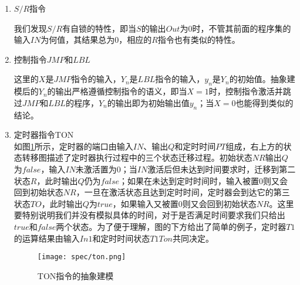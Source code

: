 \begin{enumerate}
	\item $S/R$指令\\
	\begin{center}
	\end{center}
	我们发现$S/R$有自锁的特性，即当$S$的输出$Out$为0时，不管其前面的程序集的输入$IN$为何值，其结果总为0，相应的$R$指令也有类似的特性。

	\item 控制指令$JMP$和$LBL$\\
	\begin{center}
	\end{center}
	这里的$X$是$JMP$指令的输入，$Y_n$是$LBL$指令的输入，$y_n$是$Y_n$的初始值。抽象建模后的$Y_n$的输出严格遵循控制指令的语义，即当$X=1$时，控制指令激活并跳过$JMP$和$LBL$的程序，$Y_n$的输出即为初始输出值$y_n$；当$X=0$也能得到类似的结论。
	\item 定时器指令TON\\
	如图\ref{fig22}所示，定时器的端口由输入$IN$、输出$Q$和定时时间$PT$组成，右上方的状态转移图描述了定时器执行过程中的三个状态迁移过程。初始状态$NR$输出$Q$为$false$，输入$IN$未激活置为0；当$IN$激活后但未达到时间要求时，迁移到第二状态$R$，此时输出$Q$仍为$false$；如果在未达到定时时间时，输入被置0则又会回到初始状态$NR$，一旦在激活状态且达到定时时间，定时器会到达它的第三状态$TO$，此时输出$Q$为$true$，如果输入又被置0则又会回到初始状态$NR$。这里要特别说明我们并没有模拟具体的时间，对于是否满足时间要求我们只给出$true$和$false$两个状态。为了便于理解，图的下方给出了简单的例子，定时器$T1$的运算结果由输入$In1$和定时时间状态$T1Ton$共同决定。
	\begin{figure}[!htb]
	\centering
	\texttt{[image: spec/ton.png]}
	\caption{TON指令的抽象建模}
	\label{fig22}
	\end{figure}



\end{enumerate}
